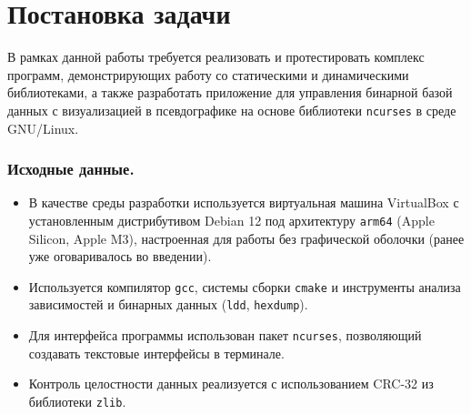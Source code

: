 \section{Постановка задачи}

В рамках данной работы требуется реализовать и протестировать комплекс программ, демонстрирующих работу со статическими и динамическими библиотеками, а также разработать приложение для управления бинарной базой данных с визуализацией в псевдографике на основе библиотеки \texttt{ncurses} в среде GNU/Linux.

\subsubsection*{Исходные данные.}
\begin{itemize}
\item В качестве среды разработки используется виртуальная машина VirtualBox с установленным дистрибутивом Debian 12 под архитектуру \texttt{arm64} (Apple Silicon, Apple M3), настроенная для работы без графической оболочки (ранее уже оговаривалось во введении).
\item Используется компилятор \texttt{gcc}, системы сборки \texttt{cmake} и инструменты анализа зависимостей и бинарных данных (\texttt{ldd}, \texttt{hexdump}).
\item Для интерфейса программы использован пакет \texttt{ncurses}, позволяющий создавать текстовые интерфейсы в терминале.
\item Контроль целостности данных реализуется с использованием CRC-32 из библиотеки \texttt{zlib}.
\end{itemize}

